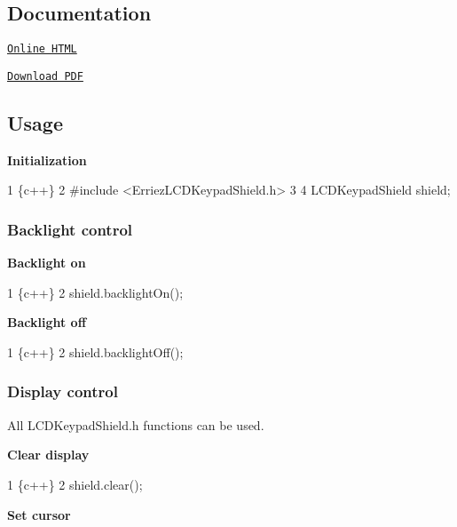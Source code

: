 \subsection*{Documentation}


\begin{DoxyItemize}
\item \href{https://Erriez.github.io/ErriezLCDKeypadShield}{\tt Online H\+T\+ML}
\item \href{https://github.com/Erriez/ErriezLCDKeypadShield/raw/gh-pages/latex/ErriezLCDKeypadShield.pdf}{\tt Download P\+DF}
\end{DoxyItemize}

\subsection*{Usage}

{\bfseries Initialization}


\begin{DoxyCode}
1 \{c++\}
2 #include <ErriezLCDKeypadShield.h>
3 
4 LCDKeypadShield shield;
\end{DoxyCode}


\subsubsection*{Backlight control}

{\bfseries Backlight on}


\begin{DoxyCode}
1 \{c++\}
2 shield.backlightOn();
\end{DoxyCode}


{\bfseries Backlight off}


\begin{DoxyCode}
1 \{c++\}
2 shield.backlightOff();
\end{DoxyCode}


\subsubsection*{Display control}

All {\ttfamily L\+C\+D\+Keypad\+Shield.\+h} functions can be used.

{\bfseries Clear display}


\begin{DoxyCode}
1 \{c++\}
2 shield.clear();
\end{DoxyCode}


{\bfseries Set cursor}


